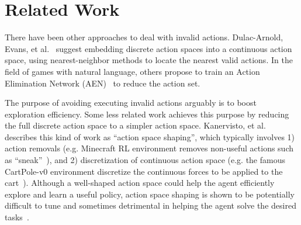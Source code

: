 \documentclass[letterpaper]{article}
\begin{document}




\section{Related Work}
There have been other approaches to deal with invalid actions. Dulac-Arnold, Evans, et al.~\cite{dulac2015deep} suggest embedding discrete action spaces into a continuous action space, using nearest-neighbor methods to locate the nearest valid actions. In the field of games with natural language, others propose to train an Action Elimination Network (AEN)~\cite{zahavy2018learn} to reduce the action set.

The purpose of avoiding executing invalid actions arguably is to boost exploration efficiency. Some less related work achieves this purpose by reducing the full discrete action space to a simpler action space. Kanervisto, et al.~\cite{kanervisto2020action} describes this kind of work as ``action space shaping'', which typically involves 1) action removals (e.g. Minecraft RL environment removes non-useful actions such as ``sneak''~\cite{johnson2016malmo}), and 2) discretization of continuous action space (e.g. the famous CartPole-v0 environment discretize the continuous forces to be applied to the cart~\cite{brockman2016openai}). Although a well-shaped action space could help the agent efficiently explore and learn a useful policy, action space shaping is shown to be potentially difficult to tune and sometimes detrimental in helping the agent solve the desired tasks~\cite{dulac2015deep}.
\end{document}

